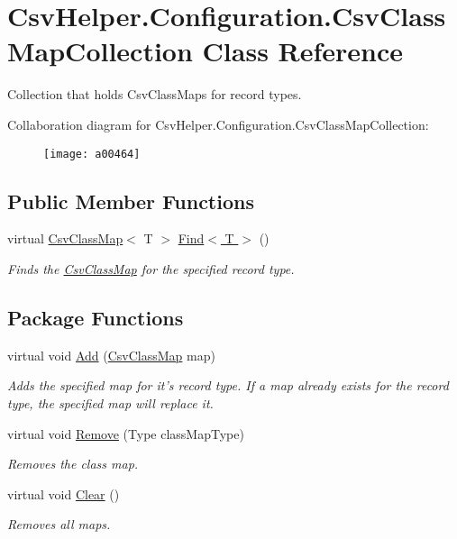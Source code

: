 \hypertarget{a00052}{\section{Csv\-Helper.\-Configuration.\-Csv\-Class\-Map\-Collection Class Reference}
\label{a00052}
}


Collection that holds Csv\-Class\-Maps for record types.  




Collaboration diagram for Csv\-Helper.\-Configuration.\-Csv\-Class\-Map\-Collection\-:
\nopagebreak
\begin{figure}[H]
\begin{center}
\leavevmode
\texttt{[image: a00464]}
\end{center}
\end{figure}
\subsection*{Public Member Functions}
\begin{DoxyCompactItemize}
\item 
virtual \hyperlink{a00050}{Csv\-Class\-Map}$<$ T $>$ \hyperlink{a00052_ac75513617b6c256c3d693adf4482e1ed}{Find$<$ T $>$} ()
\begin{DoxyCompactList}\small\item\em Finds the \hyperlink{a00050}{Csv\-Class\-Map} for the specified record type. \end{DoxyCompactList}\end{DoxyCompactItemize}
\subsection*{Package Functions}
\begin{DoxyCompactItemize}
\item 
virtual void \hyperlink{a00052_aab6a14a4c1a614fac511ddd6af2c9e40}{Add} (\hyperlink{a00050}{Csv\-Class\-Map} map)
\begin{DoxyCompactList}\small\item\em Adds the specified map for it's record type. If a map already exists for the record type, the specified map will replace it. \end{DoxyCompactList}\item 
virtual void \hyperlink{a00052_a0b18f7ab62839aa354021986e5a2ef96}{Remove} (Type class\-Map\-Type)
\begin{DoxyCompactList}\small\item\em Removes the class map. \end{DoxyCompactList}\item 
virtual void \hyperlink{a00052_a91718f9b6527a7f833393d24587716cc}{Clear} ()
\begin{DoxyCompactList}\small\item\em Removes all maps. \end{DoxyCompactList}\end{DoxyCompactItemize}
